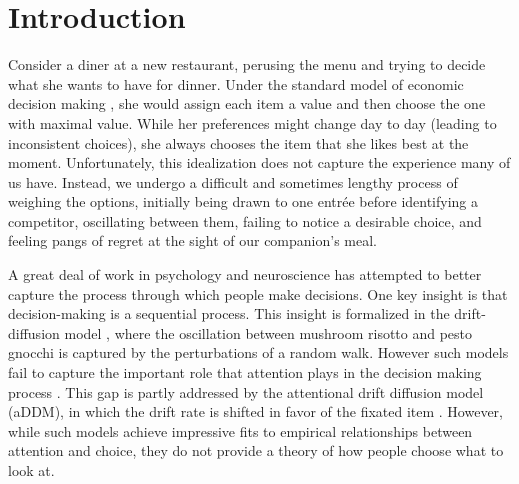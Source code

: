 \documentclass[11pt]{article} %
\begin{document}
\begin{abstract}


\end{abstract}




\startmain %

\section{Introduction}

Consider a diner at a new restaurant, perusing the menu and trying to decide what she wants to have for dinner. Under the standard model of economic decision making \citep{Kahneman1979,Rangel2008}, she would assign each item a value and then choose the one with maximal value. While her preferences might change day to day (leading to inconsistent choices), she always chooses the item that she likes best at the moment. Unfortunately, this idealization does not capture the experience many of us have. Instead, we undergo a difficult and sometimes lengthy process of weighing the options, initially being drawn to one entr\'ee before identifying a competitor, oscillating between them, failing to notice a desirable choice, and feeling pangs of regret at the sight of our companion's meal.

A great deal of work in psychology and neuroscience has attempted to better capture the process through which people make decisions. One key insight is that decision-making is a sequential process. This insight is formalized in the drift-diffusion model \citep{Ratcliff1978,Milosavljevic2010}, where the oscillation between mushroom risotto and pesto gnocchi is captured by the perturbations of a random walk. However such models fail to capture the important role that attention plays in the decision making process \citep{Orquin2013}. This gap is partly addressed by the attentional drift diffusion model (aDDM), in which the drift rate is shifted in favor of the fixated item \citep{Krajbich2010}. However, while such models achieve impressive fits to empirical relationships between attention and choice, they do not provide a theory of how people choose what to look at.
\end{document}
